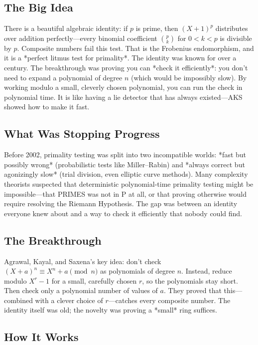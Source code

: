 \subsection{The Big Idea}
There is a beautiful algebraic identity: if $p$ is prime, then $(X + 1)^p$ distributes over addition perfectly---every binomial coefficient $\binom{p}{k}$ for $0 < k < p$ is divisible by $p$. Composite numbers fail this test. That is the Frobenius endomorphism, and it is a *perfect litmus test for primality*. The identity was known for over a century. The breakthrough was proving you can *check it efficiently*: you don't need to expand a polynomial of degree $n$ (which would be impossibly slow). By working modulo a small, cleverly chosen polynomial, you can run the check in polynomial time. It is like having a lie detector that has always existed---AKS showed how to make it fast.

\subsection{What Was Stopping Progress}
Before 2002, primality testing was split into two incompatible worlds: *fast but possibly wrong* (probabilistic tests like Miller--Rabin) and *always correct but agonizingly slow* (trial division, even elliptic curve methods). Many complexity theorists suspected that deterministic polynomial-time primality testing might be impossible---that PRIMES was not in P at all, or that proving otherwise would require resolving the Riemann Hypothesis. The gap was between an identity everyone knew about and a way to check it efficiently that nobody could find.

\subsection{The Breakthrough}
Agrawal, Kayal, and Saxena's key idea: don't check $(X + a)^n \equiv X^n + a \pmod{n}$ as polynomials of degree $n$. Instead, reduce modulo $X^r - 1$ for a small, carefully chosen $r$, so the polynomials stay short. Then check only a polynomial number of values of $a$. They proved that this---combined with a clever choice of $r$---catches every composite number. The identity itself was old; the novelty was proving a *small* ring suffices.

\subsection{How It Works}

